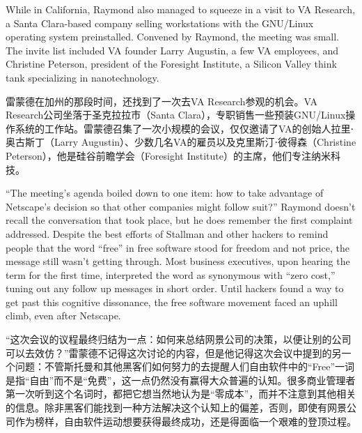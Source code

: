 \ifdefined\eng
While in California, Raymond also managed to squeeze in a visit to VA Research, a Santa Clara-based company selling workstations with the GNU/Linux operating system preinstalled. Convened by Raymond, the meeting was small. The invite list included VA founder Larry Augustin, a few VA employees, and Christine Peterson, president of the Foresight Institute, a Silicon Valley think tank specializing in nanotechnology.
\fi

\ifdefined\chs
雷蒙德在加州的那段时间，还找到了一次去VA Research参观的机会。VA Research公司坐落于圣克拉拉市（Santa Clara），专职销售一些预装GNU/Linux操作系统的工作站。雷蒙德召集了一次小规模的会议，仅仅邀请了VA的创始人拉里⋅奥古斯丁（Larry Augustin）、少数几名VA的雇员以及克里斯汀⋅彼得森（Christine Peterson），他是硅谷前瞻学会（Foresight Institute）的主席，他们专注纳米科技。
\fi

\ifdefined\eng
``The meeting's agenda boiled down to one item: how to take advantage of Netscape's decision so that other companies might follow suit?'' Raymond doesn't recall the conversation that took place, but he does remember the first complaint addressed. Despite the best efforts of Stallman and other hackers to remind people that the word ``free'' in free software stood for freedom and not price, the message still wasn't getting through. Most business executives, upon hearing the term for the first time, interpreted the word as synonymous with ``zero cost,'' tuning out any follow up messages in short order. Until hackers found a way to get past this cognitive dissonance, the free software movement faced an uphill climb, even after Netscape.
\fi

\ifdefined\chs
``这次会议的议程最终归结为一点：如何来总结网景公司的决策，以便让别的公司可以去效仿？''雷蒙德不记得这次讨论的内容，但是他记得这次会议中提到的另一个问题：不管斯托曼和其他黑客们如何努力的去提醒人们自由软件中的``Free''一词是指``自由''而不是``免费''，这一点仍然没有赢得大众普遍的认知。很多商业管理者第一次听到这个名词时，都把它想当然地认为是``零成本''，而并不注意到其他相关的信息。除非黑客们能找到一种方法解决这个认知上的偏差，否则，即使有网景公司作为榜样，自由软件运动想要获得最终成功，还是得面临一个艰难的登顶过程。
\fi


